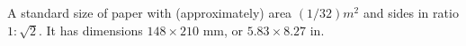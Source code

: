 A standard size of paper with (approximately) area $(1/32)m^{2}$  and sides in ratio
$ 1 : \sqrt{2}$. It has dimensions $148 \times 210$ mm, or $5.83 \times 8.27$ in.